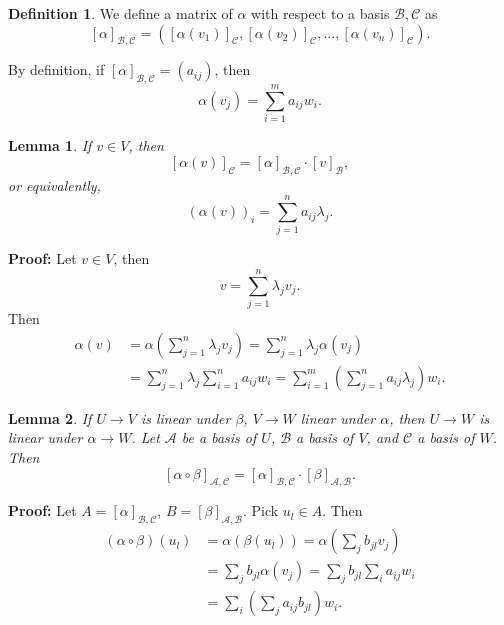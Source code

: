 \documentclass[12pt]{article}
\newtheorem{lemma}{Lemma}[section]
\theoremstyle{definition}
\newtheorem{definition}{Definition}[section]
\theoremstyle{remark}
\begin{document}
\begin{definition}
	We define a matrix of $\alpha$ with respect to a basis $\mathcal{B}, \mathcal{C}$ as
	\[
		[\alpha]_{\mathcal{B}, \mathcal{C}} = ([\alpha(v_1)]_{\mathcal{C}}, [\alpha(v_2)]_{\mathcal{C}}, \ldots, [\alpha(v_n)]_{\mathcal{C}})
	.\]
\end{definition}

By definition, if $[\alpha]_{\mathcal{B}, \mathcal{C}} = (a_{ij})$, then
\[
	\alpha(v_j) = \sum_{i = 1}^{m} a_{ij} w_i
.\]

\begin{lemma}
	If $v \in V$, then
	\[
		[\alpha(v)]_{\mathcal{C}} = [\alpha]_{\mathcal{B}, \mathcal{C}} \cdot [v]_{\mathcal{B}}
	,\]
	or equivalently,
	\[
		(\alpha (v))_{i} = \sum_{j = 1}^{n} a_{ij} \lambda_j
	.\] 
\end{lemma}

\begin{adjustbox}{minipage = \columnwidth - 25.5pt, margin=1em, frame=1pt, margin=0em}
\textbf{Proof:} Let $v \in V$, then
\[
v = \sum_{j = 1}^{n} \lambda_j v_j
.\]
Then
 \begin{align*}
	 \alpha(v) &= \alpha \left( \sum_{j = 1}^{n} \lambda_j v_j \right) = \sum_{j = 1}^{n} \lambda_j \alpha(v_j) \\
		   &= \sum_{j = 1}^{n} \lambda_j \sum_{i = 1}^{n} a_{ij} w_i = \sum_{i = 1}^{m} \left( \sum_{j = 1}^{n} a_{ij} \lambda_j \right) w_i.
\end{align*}

\end{adjustbox}

\begin{lemma}
	If $U \to V$ is linear under $\beta$, $V \to W$ linear under $\alpha$, then $U \to W$ is linear under $\alpha \to W$. Let $\mathcal{A}$ be a basis of $U$, $\mathcal{B}$ a basis of $V$, and $\mathcal{C}$ a basis of $W$. Then
	\[
		[\alpha \circ \beta]_{\mathcal{A}, \mathcal{C}} = [\alpha]_{\mathcal{B}, \mathcal{C}} \cdot [\beta]_{\mathcal{A}, \mathcal{B}}
	.\] 
\end{lemma}

\begin{adjustbox}{minipage = \columnwidth - 25.5pt, margin=1em, frame=1pt, margin=0em}
	\textbf{Proof:} Let $A = [\alpha]_{\mathcal{B}, \mathcal{C}}$, $B = [\beta]_{\mathcal{A}, \mathcal{B}}$. Pick $u_l \in A$. Then
	\begin{align*}
		(\alpha \circ \beta)(u_l) &= \alpha(\beta(u_l)) = \alpha\left( \sum_{j} b_{jl} v_j \right) \\
					  &= \sum_{j} b_{jl} \alpha(v_j) = \sum_{j}b_{jl}\sum_{i}a_{ij}w_i \\
					  &= \sum_{i}\left( \sum_{j} a_{ij} b_{jl} \right) w_i.
	\end{align*}
\end{adjustbox}
\end{document}
